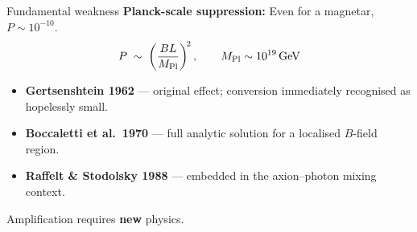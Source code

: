 \begin{frame}{Fundamental weakness}
  \textbf{Planck-scale suppression:} Even for a magnetar, $P\sim 10^{-10}$.
  \[
    P \;\sim\; \left(\frac{B L}{M_{\rm Pl}}\right)^{\!2}, \qquad M_{\rm Pl}\sim 10^{19}\,\text{GeV}
  \]

  \vspace{0.15em}
  \begin{itemize}\small
    \item \textbf{Gertsenshtein 1962} --- original effect; conversion immediately recognised as hopelessly small.
    \item \textbf{Boccaletti et al.\ 1970} --- full analytic solution for a localised $B$-field region.
    \item \textbf{Raffelt \& Stodolsky 1988} --- embedded in the axion--photon mixing context.
  \end{itemize}

  \vspace{0.15em}
  Amplification requires \textbf{new} physics.
\end{frame}
